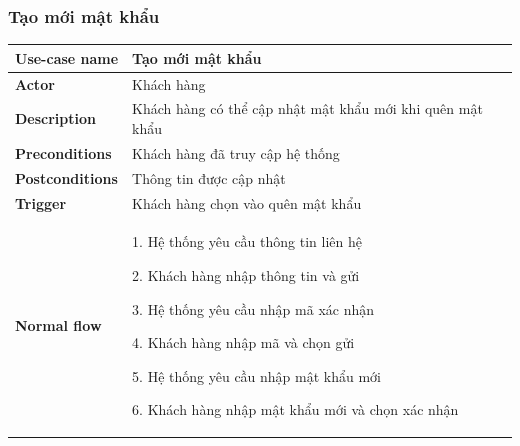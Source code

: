         \subsubsection{Tạo mới mật khẩu}
        {
\setlength\extrarowheight{6pt}
            \begin{longtable}{| p{} | p{} |} 
                \hline
                    \textbf{Use-case name} 
                & 
                    Tạo mới mật khẩu
                \\
                \hline
                    \textbf{Actor} 
                & 
                    Khách hàng
                \\
                \hline
                    \textbf{Description} 
                & 
                  Khách hàng có thể cập nhật mật khẩu mới khi quên mật khẩu
                \\
                \hline
                    \textbf{Preconditions} 
                &
                    Khách hàng đã truy cập hệ thống
                \\
                \hline
                    \textbf{Postconditions} 
                & 
                    Thông tin được cập nhật
                \\
                \hline
                    \textbf{Trigger} 
                & 
                    Khách hàng chọn vào quên mật khẩu
                \\
                \hline
                \begin{flushleft}
                    \textbf{Normal flow}
                \end{flushleft}
                & 
                1. Hệ thống yêu cầu thông tin liên hệ
                    
                    2. Khách hàng nhập thông tin và gửi
                    
                    3. Hệ thống yêu cầu nhập mã xác nhận
                    
                    4. Khách hàng nhập mã và chọn gửi
                    
                    5. Hệ thống yêu cầu nhập mật khẩu mới
                    
                    6. Khách hàng nhập mật khẩu mới và chọn xác nhận
                    

\end{longtable}}
